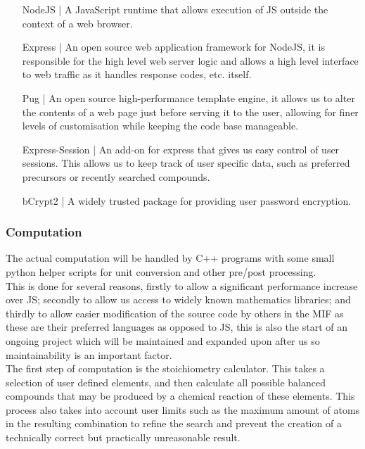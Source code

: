 \documentclass[a4paper, 12pt]{article}
\begin{document}
\begin{enumerate}[label = {}, leftmargin=\widthof{Express |}+\labelsep]
	\item[NodeJS |] A JavaScript runtime that allows execution of JS outside the context of a web browser. 
	
	\item[Express |] An open source web application framework for NodeJS, it is responsible for the high level web server logic and allows a high level interface to web traffic as it handles response codes, etc. itself.
	
	\item[Pug |] An open source high-performance template engine, it allows us to alter the contents of a web page just before serving it to the user, allowing for finer levels of customisation while keeping the code base manageable.
\end{enumerate}
\pagebreak
\begin{enumerate}[label = {}, leftmargin=\widthof{Express-Session |}+\labelsep]	
	\item[Express-Session |] An add-on for express that gives us easy control of user sessions. This allows us to keep track of user specific data, such as preferred precursors or recently searched compounds.
	
	\item[bCrypt2 |] A widely trusted package for providing user password encryption.
\end{enumerate}

\subsubsection{Computation}
The actual computation will be handled by C++ programs with some small python helper scripts for unit conversion and other pre/post processing. \\

This is done for several reasons, firstly to allow a significant performance increase over JS; secondly to allow us access to widely known mathematics libraries; and thirdly to allow easier modification of the source code by others in the MIF as these are their preferred languages as opposed to JS, this is also the start of an ongoing project which will be maintained and expanded upon after us so maintainability is an important factor. \\

The first step of computation is the stoichiometry calculator. This takes a selection of user defined elements, and then calculate all possible balanced compounds that may be produced by a chemical reaction of these elements. This process also takes into account user limits such as the maximum amount of atoms in the resulting combination to refine the search and prevent the creation of a technically correct but practically unreasonable result. \\
\end{document}
